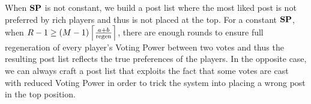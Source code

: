 \begin{proofsketch}
  When $\stpowvec$ is not constant, we build a post list where the most liked
  post is not preferred by rich players and thus is not placed at the top. For a
  constant $\stpowvec$, when $\rounds - 1 \geq \left(\postlen -
  1\right)\ceil*{\frac{a +b}{\regen}}$, there are enough rounds to ensure full
  regeneration of every player's Voting Power between two votes and thus the
  resulting post list reflects the true preferences of the players. In the
  opposite case, we can always craft a post list that exploits the fact that
  some votes are cast with reduced Voting Power in order to trick the system
  into placing a wrong post in the top position.
\end{proofsketch}
